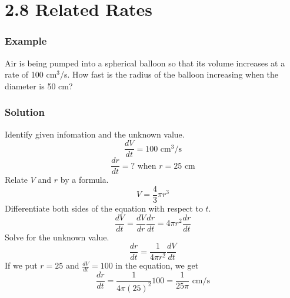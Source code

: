 %
%

\section*{2.8 Related Rates}

\subsubsection*{Example}

Air is being pumped into a spherical balloon so that its volume increases at a rate of 100 cm\(^3\)/s. How fast is the radius of the balloon increasing when the diameter is 50 cm?

\subsubsection*{Solution}

Identify given infomation and the unknown value.
$$ \frac{dV}{dt} = 100 \text{ cm}^3/\text{s} $$
$$ \frac{dr}{dt} =\text{? when } r = 25 \text{ cm} $$
Relate \(V\) and \(r\) by a formula.
$$ V=\frac{4}{3} \pi r^3 $$
Differentiate both sides of the equation with respect to \(t\).
$$ \frac{dV}{dt}=\frac{dV}{dr}\frac{dr}{dt}=4 \pi r^2 \frac{dr}{dt} $$
Solve for the unknown value.
$$ \frac{dr}{dt} = \frac{1}{4 \pi r^2} \frac{dV}{dt} $$
If we put \(r=25\) and \(\frac{dV}{dt}=100\) in the equation, we get
$$ \frac{dr}{dt} = \frac{1}{4 \pi {(25)}^2}100=\frac{1}{25 \pi} \text{ cm/s} $$ 
